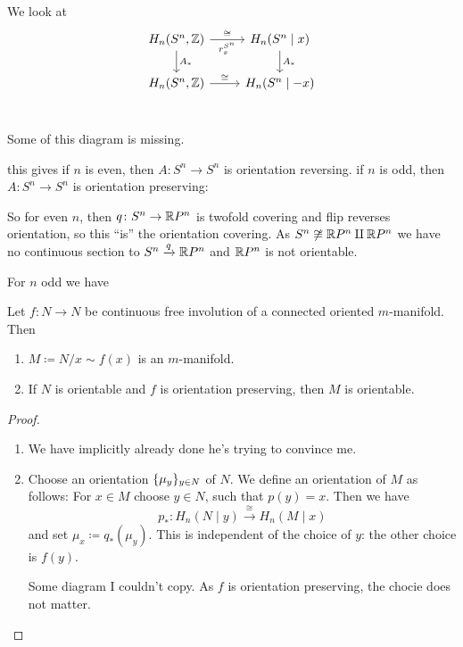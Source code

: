 \documentclass[language=english]{TemplateLecture}
\begin{document}
We look at
\[\begin{tikzcd}
    H_n(S^n, \IZ) \ar[d, "A_*"] \ar[r, "\cong", "r_x^{S^n}"'] & H_n(S^n \mid x) \ar[d, "A_*"] \\
    H_n(S^n, \IZ) \ar[r, "\cong"] & H_n(S^n \mid -x) \\
\end{tikzcd}\]

Some of this diagram is missing.

this gives if \(n\) is even, then \(A \colon S^n \to S^n\) is orientation reversing. if \(n\) is odd, then \(A\colon S^n \to S^n\) is orientation preserving:

 So for even \(n\), then \(q\colon S^n \to \mathbb{R} P^n\) is twofold covering and flip reverses orientation, so this \enquote{is} the orientation covering. As \(S^n \not \cong \mathbb{R} P^n \amalg \mathbb{R} P^n\) we have no continuous section to \(S^n \xrightarrow{q} \mathbb{R} P^n\) and \(\mathbb{R} P^n\) is not orientable.

 For \(n\) odd we have

 \begin{proposition}
    Let \(f\colon N \to N\) be continuous free involution of a connected oriented \(m\)-manifold. Then
    \begin{enumerate}
        \item \(M \coloneq N/x\sim f(x)\) is an \(m\)-manifold.
        \item If \(N\) is orientable and \(f\) is orientation preserving, then \(M\) is orientable.
    \end{enumerate}
 \end{proposition}

 \begin{proof}
    \begin{enumerate}
        \item We have implicitly already done he's trying to convince me.
        \item Choose an orientation \(\{\mu_y\}_{y \in N}\) of \(N\). We define an orientation of \(M\) as follows: For \(x \in M\) choose \(y \in N\), such that \(p(y) = x\). Then we have
        \[p_*\colon H_n(N\mid y) \xrightarrow{\cong} H_n(M \mid x)\]
        and set \(\mu_x \coloneq q_*(\mu_y)\). This is independent of the choice of \(y\): the other choice is \(f(y)\).

        Some diagram I couldn't copy. As \(f\) is orientation preserving, the chocie does not matter.
    \end{enumerate}
 \end{proof}
\end{document}
